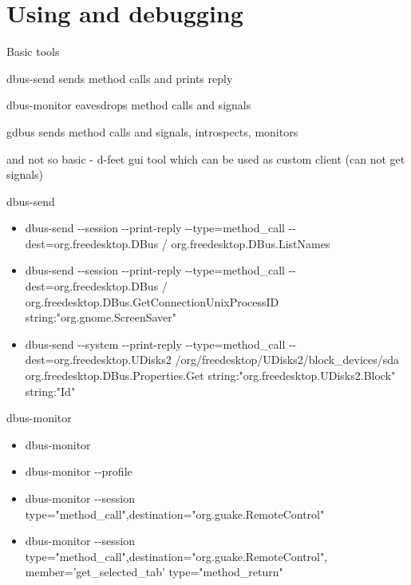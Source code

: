 \documentclass{beamer}
\begin{document}
\section{Using and debugging}

\begin{frame}{Basic tools}
  \begin{block}{dbus-send}
    sends method calls and prints reply
  \end{block}
  \begin{block}{dbus-monitor}
    eavesdrops method calls and signals
  \end{block}
  \begin{block}{gdbus}
    sends method calls and signals, introspects, monitors
  \end{block}
  \begin{block}{and not so basic - d-feet}
    gui tool which can be used as custom client (can not get signals)
  \end{block}
\end{frame}

\begin{frame}{dbus-send}
  \begin{itemize}
    \item dbus-send -{}-session -{}-print-reply -{}-type=method\_call -{}-dest=org.freedesktop.DBus / org.freedesktop.DBus.ListNames
    \item dbus-send -{}-session -{}-print-reply -{}-type=method\_call -{}-dest=org.freedesktop.DBus / org.freedesktop.DBus.GetConnectionUnixProcessID string:"org.gnome.ScreenSaver"
    \item dbus-send -{}-system -{}-print-reply -{}-type=method\_call -{}-dest=org.freedesktop.UDisks2 /org/freedesktop/UDisks2/block\_devices/sda org.freedesktop.DBus.Properties.Get string:"org.freedesktop.UDisks2.Block" string:"Id"
  \end{itemize}
\end{frame}

\begin{frame}{dbus-monitor}
  \begin{itemize}
    \item dbus-monitor
    \item dbus-monitor -{}-profile
    \item dbus-monitor -{}-session type="method\_call",destination="org.guake.RemoteControl"
    \item dbus-monitor -{}-session type="method\_call",destination="org.guake.RemoteControl",\\member='get\_selected\_tab' type="method\_return"
  \end{itemize}
\end{frame}
\end{document}

